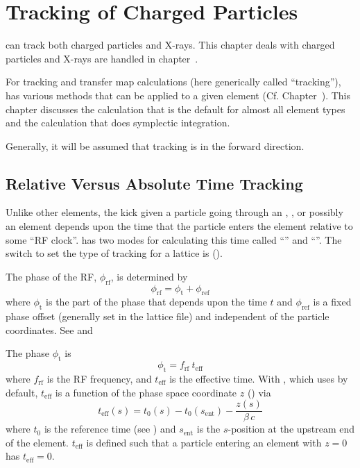 \chapter{Tracking of Charged Particles}
\label{c:charged.track}

\bmad can track both charged particles and X-rays. This chapter deals with charged particles and
X-rays are handled in chapter~.

For tracking and transfer map calculations (here generically called ``tracking''), \bmad has various
methods that can be applied to a given element (Cf. Chapter~). This chapter
discusses the  calculation that is the default for almost all element types and
the  calculation that does symplectic integration.

Generally, it will be assumed that tracking is in the forward direction.

\section{Relative Versus Absolute Time Tracking}
\label{s:rf.time}

Unlike other elements, the kick given a particle going through an , , or
possibly an  element depends upon the time that the particle enters the element
relative to some ``RF clock''. \bmad has two modes for calculating this time called ``'' and ``''. The switch to set the type of tracking for a
lattice is  ().

The phase of the RF, $\phi_\text{rf}$, is determined by
\begin{equation}
  \phi_\text{rf} = \phi_\text{t} + \phi_\text{ref}
\end{equation}
where $\phi_\text{t}$ is the part of the phase that depends upon the time $t$ and $\phi_\text{ref}$
is a fixed phase offset (generally set in the lattice file) and independent of the particle
coordinates. See  and 

The phase $\phi_\text{t}$ is 
\begin{equation}
  \phi_\text{t} = f_\text{rf} \ t_\text{eff}
\end{equation}
where $f_\text{rf}$ is the RF frequency, and $t_\text{eff}$ is the effective time. With , which \bmad uses by default, $t_\text{eff}$ is a function of the 
phase space coordinate $z$ () via
\begin{equation}
  t_\text{eff}(s) = t_0(s) - t_0(s_\text{ent}) - \frac{z(s)}{\beta \, c}
  \label{tttz}
\end{equation}
where $t_0$ is the reference time (see ) and $s_\text{ent}$ is the $s$-position at the
upstream end of the element. $t_\text{eff}$ is defined such that a particle entering an element 
with $z = 0$ has $t_\text{eff} = 0$.

